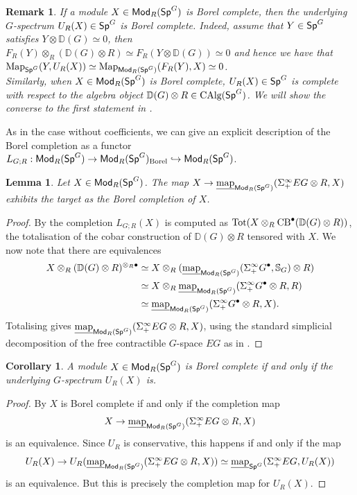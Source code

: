 \documentclass[reqno]{amsart}
\numberwithin{equation}{section}\theoremstyle{thms}
\newtheorem{cor}[equation]{Corollary}
\newtheorem{lem}[equation]{Lemma}
\theoremstyle{defn}
\newtheorem{rem}[equation]{Remark}
\newcommand{\bD}{\mathbb{D}}
\newcommand{\bS}{\mathbb{S}}
\newcommand{\tn}[1]{\textnormal{#1}}
\newcommand{\tsf}[1]{\textsf{\textup{#1}}}
\newcommand{\underl}[1]{\underline{#1}}
\newcommand{\Map}{\tn{Map}}
\newcommand{\imap}{\underl{\tn{map}}}
\newcommand{\calg}{\tn{CAlg}}
\newcommand{\Mod}{\tsf{Mod}}
\newcommand{\specg}{\tsf{Sp}^G}
\begin{document}
\begin{rem}\label{rem:completeunderlyingeasydirection}
If a module $X \in \Mod_R(\specg)$ is Borel complete, then the underlying $G$-spectrum $U_R(X) \in \specg$ is Borel complete. Indeed, assume that $Y \in \specg$ satisfies $Y \otimes \bD(G) \simeq 0$, then $F_R(Y) \otimes_R (\bD(G) \otimes R) \simeq F_R(Y \otimes \bD(G)) \simeq 0$ and hence we have that $\Map_{\specg}(Y,U_R(X)) \simeq \Map_{\Mod_R(\specg)}(F_R(Y),X) \simeq 0$. \\
Similarly, when $X \in \Mod_R(\specg)$ is Borel complete, $U_R(X) \in \specg$ is complete with respect to the algebra object $\bD(G) \otimes R \in \calg(\specg)$. We will show the converse to the first statement in .
\end{rem}

As in the case without coefficients, we can give an explicit description of the Borel completion as a functor $L_{G;R}: \Mod_R(\specg) \to \Mod_R(\specg)_{\tn{Borel}} \hookrightarrow \Mod_R(\specg)$.

\begin{lem}\label{lem:completionexplicit}
Let $X \in \Mod_R(\specg)$. The map $X \to \imap_{\Mod_R(\specg)}(\Sigma^{\infty}_+EG \otimes R, X)$ exhibits the target as the Borel completion of $X$.
\end{lem}
\begin{proof}
By \cite[Proposition 2.21]{mnn17} the completion $L_{G;R}(X)$ is computed as $\tn{Tot}(X \otimes_R \tn{CB}^{\bullet}(\bD(G) \otimes R))$, the totalisation of the cobar construction of $\bD(G) \otimes R$ tensored with $X$. We now note that there are equivalences
\begin{align*}
X \otimes_R (\bD(G) \otimes R)^{\otimes_R \bullet} &\simeq X \otimes_R (\imap_{\Mod_R(\specg)}(\Sigma^{\infty}_+G^{\bullet}, \bS_G) \otimes R) \\
&\simeq X \otimes_R \imap_{\Mod_R(\specg)}(\Sigma^{\infty}_+G^{\bullet} \otimes R, R) \\
&\simeq \imap_{\Mod_R(\specg)}(\Sigma^{\infty}_+G^{\bullet} \otimes R, X).
\end{align*}
Totalising gives $\imap_{\Mod_R(\specg)}(\Sigma^{\infty}_+EG \otimes R, X)$, using the standard simplicial decomposition of the free contractible $G$-space $EG$ as in \cite[Proposition 6.6]{mnn17}.
\end{proof}

\begin{cor}\label{cor:completionunderlying}
A module $X \in \Mod_R(\specg)$ is Borel complete if and only if the underlying $G$-spectrum $U_R(X)$ is.
\end{cor}
\begin{proof}
By  $X$ is Borel complete if and only if the completion map 
$$X \to \imap_{\Mod_R(\specg)}(\Sigma^{\infty}_+EG \otimes R, X)$$ 
is an equivalence. Since $U_R$ is conservative, this happens if and only if the map 
$$U_R(X) \to U_R(\imap_{\Mod_R(\specg)}(\Sigma^{\infty}_+EG \otimes R, X)) \simeq \imap_{\specg}(\Sigma^{\infty}_+EG, U_R(X))$$ is an equivalence. But this is precisely the completion map for $U_R(X)$.
\end{proof}
\end{document}
